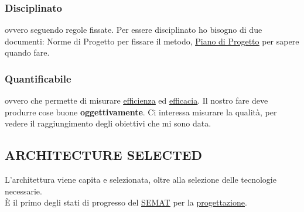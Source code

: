 			\subsubsection{Disciplinato} \label{disciplinato}
			ovvero seguendo regole fissate.
			Per essere disciplinato ho bisogno di due documenti: Norme di Progetto per fissare il metodo, \underline{\hyperref[piano]{Piano di Progetto}} per sapere quando fare.
			\subsubsection{Quantificabile} \label{quantificabile}
			ovvero che permette di misurare \underline{\hyperref[efficienza]{efficienza}} ed \underline{\hyperref[efficacia]{efficacia}}. Il nostro fare deve produrre cose buone \textbf{oggettivamente}. Ci interessa misurare la qualità, per vedere il raggiungimento degli obiettivi che mi sono data.

		\subsection{ARCHITECTURE SELECTED}		\label{architectureselected}
		L'architettura viene capita e selezionata, oltre alla selezione delle tecnologie necessarie. \\
		È il primo degli stati di progresso del \underline{\hyperref[semat]{SEMAT}} per la \underline{\hyperref[progettazione]{progettazione}}.

